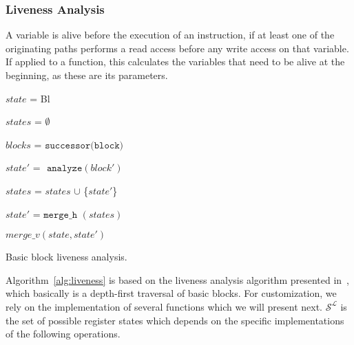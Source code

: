 \subsubsection{Liveness Analysis}
A variable is alive before the execution of an instruction, if at least one of the originating paths performs a read access before any write access on that variable. 
If applied to a function, this calculates the variables that need to be alive at the beginning, as these are its parameters. 

\begin{algorithm}[h!]
        \footnotesize
 	\SetAlgoLined
        \BlankLine
	{
 	$state$ = Bl 
 	

	$states$ = $\emptyset$                                                 
	
	$blocks$ = $\texttt{successor(block)}$                                   
	
	 {
	
 		$state'$ = $\texttt{ analyze}(block')$   
 		
		$states$ = $states$ $\cup$ \{$state'$\}  
	}

	$state'$ = $\texttt{merge\_h }(states)$   

	\Return $merge\_v(state, state')$  

	}
\caption{Basic block liveness analysis.}
\label{alg:liveness}
\end{algorithm}

Algorithm~\ref{alg:liveness} is based on the liveness analysis algorithm presented in~\cite{khedker2009data}, which basically is a depth-first traversal of basic blocks. 
For customization, we rely on the implementation of several functions which we will present next. $\mathcal{S}^\mathcal{L}$ is the set of possible register states which depends on the specific 
implementations of the following operations.


